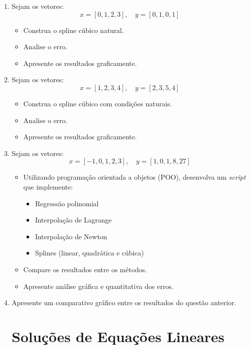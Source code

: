 \begin{enumerate}
\subsection{Spline Cúbica}

\item Sejam os vetores:
\[
x = [0, 1, 2, 3], \quad y = [0, 1, 0, 1]
\]

\begin{itemize}
    \item Construa o spline cúbico natural.
    \item Analise o erro.
    \item Apresente os resultados graficamente.
\end{itemize}

\item Sejam os vetores:
\[
x = [1, 2, 3, 4], \quad y = [2, 3, 5, 4]
\]

\begin{itemize}
    \item Construa o spline cúbico com condições naturais.
    \item Analise o erro.
    \item Apresente os resultados graficamente.
\end{itemize}

\item Sejam os vetores:
\[
x = [-1, 0, 1, 2, 3], \quad y = [1, 0, 1, 8, 27]
\]

\begin{itemize}
    \item Utilizando programação orientada a objetos (POO), desenvolva um \textit{script} que implemente:
    \begin{itemize}
        \item Regressão polinomial
        \item Interpolação de Lagrange
        \item Interpolação de Newton
        \item Splines (linear, quadrática e cúbica)
    \end{itemize}
    \item Compare os resultados entre os métodos.
    \item Apresente análise gráfica e quantitativa dos erros.
\end{itemize}

\item Apresente um comparativo gráfico entre os resultados do questão anterior.


\section{Soluções de Equações Lineares} \label{sec:SolSistLineares}


\end{enumerate}

